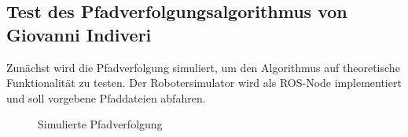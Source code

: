 \documentclass[11pt,a4paper]{article}
\begin{document}
{\subsection{Test des Pfadverfolgungsalgorithmus von Giovanni Indiveri}


Zun\"achst wird die Pfadverfolgung simuliert, um den Algorithmus auf theoretische Funktionalit\"at zu testen. Der Robotersimulator wird als ROS-Node implementiert und soll vorgebene Pfaddateien abfahren.

\begin{figure}[h]
	\caption{Simulierte Pfadverfolgung}


\end{figure}}
\end{document}
